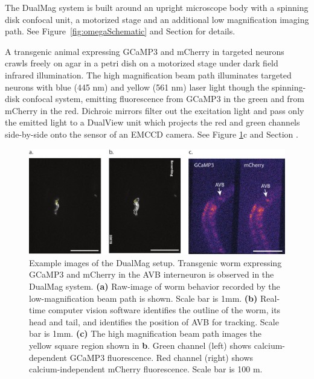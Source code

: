 The DualMag system is built around an upright microscope body with a spinning disk confocal unit, a motorized stage and an additional low magnification imaging path. See Figure~\ref{fig:omegaSchematic} and Section \label{sec:omegaOptics} for details.

A transgenic animal  expressing GCaMP3 and mCherry in targeted neurons crawls freely on agar in a petri dish on a motorized stage under dark field infrared illumination. The high magnification beam path illuminates targeted neurons with  blue (445 nm) and yellow (561 nm) laser light though the spinning-disk confocal system, emitting fluorescence from GCaMP3 in the green and from mCherry in the red. Dichroic mirrors filter out the excitation light and pass only the emitted light to a DualView unit which projects the red and green channels side-by-side onto the sensor of an  EMCCD camera. See Figure \ref{fig:omegaSampleImages}c and Section \label{sec:omegaOptics}. 


\begin{figure}  %
\includegraphics[width=\textwidth]{figures/omegaDualMagImagesWithScale}
\caption[Example images from the DualMag setup.]{Example images of the DualMag setup. Transgenic worm expressing GCaMP3 and mCherry in the AVB interneuron is observed in the DualMag system. \textbf{(a)} Raw-image of worm behavior recorded by the low-magnification beam path is shown. Scale bar is 1mm.  \textbf{(b)} Real-time computer vision software identifies the outline of the worm, its head and tail, and identifies the position of AVB for tracking. Scale bar is 1mm. \textbf{(c)} The high magnification beam path images the yellow square region shown in \textbf{b}. Green channel (left) shows calcium-dependent GCaMP3 fluorescence. Red channel (right) shows calcium-independent mCherry fluorescence. Scale bar is 100 \textmu m.
\label{fig:omegaSampleImages}}
\end{figure}

